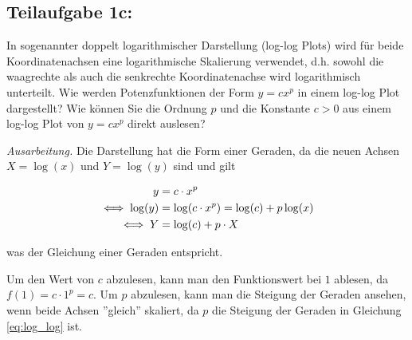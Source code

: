 \documentclass[]{article}
\newenvironment{ausarbeitung}{\vspace{3mm}\noindent\textit{Ausarbeitung.}}{}
\begin{document}
\subsection*{Teilaufgabe 1c:}
In sogenannter doppelt logarithmischer Darstellung (log-log Plots) wird für beide Koordinatenachsen eine logarithmische Skalierung verwendet, d.h. sowohl die waagrechte als auch die senkrechte Koordinatenachse wird logarithmisch unterteilt. Wie werden Potenzfunktionen der Form $y = c x^p$ in einem log-log Plot dargestellt? Wie können Sie die Ordnung $p$ und die Konstante $c > 0$ aus einem log-log Plot von $y = cx^p$ direkt auslesen?

\begin{ausarbeitung}
	Die Darstellung hat die Form einer Geraden, da die neuen Achsen $X = \log(x)$ und $Y = \log(y)$ sind und gilt 
	
	\begin{align}
		y &= c \cdot x^p\notag\\
		\iff \log(y) &= \log(c \cdot x^p) = \log(c) + p \log(x)\notag\\
		\label{eq:log_log}
		\iff Y &= \log(c) + p \cdot X
	\end{align}

	was der Gleichung einer Geraden entspricht.

	Um den Wert von $c$ abzulesen, kann man den Funktionswert bei $1$ ablesen, da $f(1) = c \cdot 1^p = c$. Um $p$ abzulesen, kann man die Steigung der Geraden ansehen, wenn beide Achsen ''gleich'' skaliert, da $p$ die Steigung der Geraden in Gleichung \ref{eq:log_log} ist.
	

\end{ausarbeitung}
\end{document}

